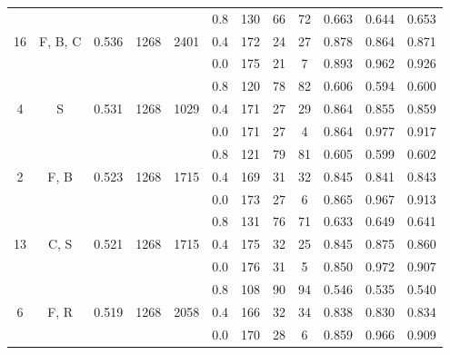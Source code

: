 \documentclass[preprint,12pt,authoryear]{elsarticle}
\begin{document}
\begin{table}
\begin{tabular}{c c c c  c ccc c c c c}
\multirow{3}{*}{16} &  \multirow{3}{*}{F, B, C} & \multirow{3}{*}{0.536 } & \multirow{3}{*}{1268} & \multirow{3}{*}{2401} &0.8 & 130 & 66 & 72 & 0.663  & 0.644  & 0.653 \\
 &  & &  &   & 0.4 & 172 & 24 & 27 & 0.878  & 0.864  & 0.871 \\
 &  & &  &   & 0.0 & 175 & 21 & 7 & 0.893  & 0.962  & 0.926 \\
\midrule
\multirow{3}{*}{4} &  \multirow{3}{*}{S} & \multirow{3}{*}{0.531 } & \multirow{3}{*}{1268} & \multirow{3}{*}{1029} &0.8 & 120 & 78 & 82 & 0.606  & 0.594  & 0.600 \\
 &  & &  &   & 0.4 & 171 & 27 & 29 & 0.864  & 0.855  & 0.859 \\
 &  & &  &   & 0.0 & 171 & 27 & 4 & 0.864  & 0.977  & 0.917 \\
\midrule
\multirow{3}{*}{2} &  \multirow{3}{*}{F, B} & \multirow{3}{*}{0.523 } & \multirow{3}{*}{1268} & \multirow{3}{*}{1715} &0.8 & 121 & 79 & 81 & 0.605  & 0.599  & 0.602 \\
 &  & &  &   & 0.4 & 169 & 31 & 32 & 0.845  & 0.841  & 0.843 \\
 &  & &  &   & 0.0 & 173 & 27 & 6 & 0.865  & 0.967  & 0.913 \\
\midrule
\multirow{3}{*}{13} &  \multirow{3}{*}{C, S} & \multirow{3}{*}{0.521 } & \multirow{3}{*}{1268} & \multirow{3}{*}{1715} &0.8 & 131 & 76 & 71 & 0.633  & 0.649  & 0.641 \\
 &  & &  &   & 0.4 & 175 & 32 & 25 & 0.845  & 0.875  & 0.860 \\
 &  & &  &   & 0.0 & 176 & 31 & 5 & 0.850  & 0.972  & 0.907 \\
\midrule
\multirow{3}{*}{6} &  \multirow{3}{*}{F, R} & \multirow{3}{*}{0.519 } & \multirow{3}{*}{1268} & \multirow{3}{*}{2058} &0.8 & 108 & 90 & 94 & 0.546  & 0.535  & 0.540 \\
 &  & &  &   & 0.4 & 166 & 32 & 34 & 0.838  & 0.830  & 0.834 \\
 &  & &  &   & 0.0 & 170 & 28 & 6 & 0.859  & 0.966  & 0.909 \\
 
\hline
\hline


\end{tabular}
\end{table}
\end{document}

